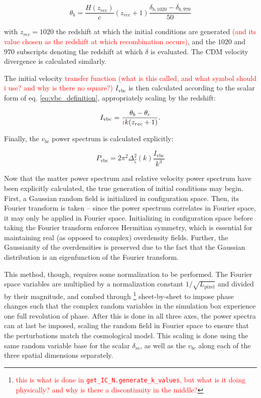 \documentclass[floats,floatfix,showpacs,amssymb,prd,superscriptaddress,nofootinbib]{revtex4-2} %
\newcommand{\code}{\texttt}
\newcommand{\red}{\textcolor{red}}
\begin{document}
\begin{equation}
    \theta_b = \frac{H(z_{rec})}{c} (z_{rec} + 1) \frac{\delta_{b, 1020} - \delta_{b, 970}}{50}
    \label{eq:velocity_divergence_practical_calculation}
\end{equation}

\noindent with $z_{rec} = 1020$ the redshift at which the initial conditions are generated \red{(and its value chosen as the redshift at which recombination occurs)}, and the $1020$ and $970$ subscripts denoting the redshift at which $\delta$ is evaluated. The CDM velocity divergence is calculated similarly.

The initial velocity \red{transfer function (what is this called, and what symbol should i use? and why is there no square?)} $I_{\text{vbc}}$ is then calculated according to the scalar form of eq. \ref{eq:vbc_definition}, appropriately scaling by the redshift:

\begin{equation}
    I_{\text{vbc}} = \frac{\theta_b - \theta_c}{\red{i} k (z_{rec} + 1)}.
\end{equation}

\noindent Finally, the $v_{bc}$ power spectrum is calculated explicitly:

\begin{equation}
    P_{\text{vbc}} = 2 \pi^2 \Delta_\zeta ^2 (k) \frac{I_{\text{vbc}}}{k^3}
\end{equation}

Now that the matter power spectrum and relative velocity power spectrum have been explicitly calculated, the true generation of initial conditions may begin. First, a Gaussian random field is initialized in configuration space. Then, its Fourier transform is taken -- since the power spectrum correlates in Fourier space, it may only be applied in Fourier space. Initializing in configuration space before taking the Fourier transform enforces Hermitian symmetry, which is essential for maintaining real (as opposed to complex) overdensity fields. Further, the Gaussianity of the overdensities is preserved due to the fact that the Gaussian distribution is an eigenfunction of the Fourier transform. 

This method, though, requires some normalization to be performed. The Fourier space variables are multiplied by a normalization constant $1 / \sqrt{L_{\text{pixel}}}$ and divided by their magnitude, and combed through \footnote{\red{this is what is done in \code{get\_IC\_N.generate\_k\_values},\red{ but what is it doing physically? and why is there a discontinuity in the middle?}}} sheet-by-sheet to impose phase changes such that the complex random variables in the simulation box experience one full revolution of phase. After this is done in all three axes, the power spectra can at last be imposed, scaling the random field in Fourier space to ensure that the perturbations match the cosmological model. This scaling is done using the same random variable base for the scalar $\delta_m$, as well as the $v_{bc}$ along each of the three spatial dimensions separately.
\end{document}
